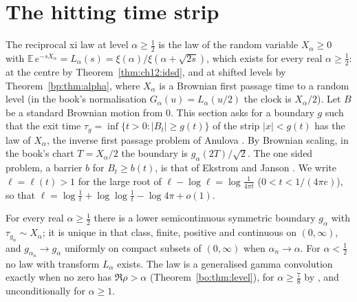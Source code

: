 \section{The hitting time strip}\label{qt:sec:strip}

The reciprocal xi law at level $\alpha\ge\tfrac12$ is the law of the random variable $X_\alpha\ge0$ with $\mathbb E\,e^{-sX_\alpha}=L_\alpha(s)=\xi(\alpha)/\xi(\alpha+\sqrt{2s})$, which exists for every real $\alpha\ge\tfrac12$: at the centre by Theorem~\ref{thm:ch12:idsd}, and at shifted levels by Theorem~\ref{bp:thm:alpha}, where $X_\alpha$ is a Brownian first passage time to a random level (in the book's normalisation $G_\alpha(u)=L_\alpha(u/2)$ the clock is $X_\alpha/2$). Let $B$ be a standard Brownian motion from $0$. This section asks for a boundary $g$ such that the exit time $\tau_g=\inf\{t>0:|B_t|\ge g(t)\}$ of the strip $|x|<g(t)$ has the law of $X_\alpha$, the inverse first passage problem of Anulova \cite{Anulova80}. By Brownian scaling, in the book's chart $T=X_\alpha/2$ the boundary is $g_\alpha(2T)/\sqrt2$. The one sided problem, a barrier $b$ for $B_t\ge b(t)$, is that of Ekstrom and Janson \cite{EkstromJanson16}. We write $\ell=\ell(t)>1$ for the large root of $\ell-\log\ell=\log\frac1{4\pi t}$ ($0<t<1/(4\pi e)$), so that $\ell=\log\frac1t+\log\log\frac1t-\log4\pi+o(1)$.

\begin{theorem}\label{qt:thm:stripexist}
For every real $\alpha\ge\tfrac12$ there is a lower semicontinuous symmetric boundary $g_\alpha$ with $\tau_{g_\alpha}\sim X_\alpha$; it is unique in that class, finite, positive and continuous on $(0,\infty)$, and $g_{\alpha_n}\to g_\alpha$ uniformly on compact subsets of $(0,\infty)$ when $\alpha_n\to\alpha$. For $\alpha<\tfrac12$ no law with transform $L_\alpha$ exists. The law is a generalised gamma convolution exactly when no zero has $\Re\rho>\alpha$ (Theorem~\ref{bo:thm:level}), for $\alpha\ge\tfrac78$ by \cite{OAI26a}, and unconditionally for $\alpha\ge1$.
\end{theorem}

